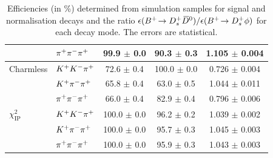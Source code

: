 \begin{table}[h]
\begin{tabular}{ l l c c c }
                              & ${{\pi}^+}{{\pi}^-}{{\pi}^+}$    & 99.9 $\pm$ 0.0         & 90.3 $\pm$ 0.3     & 1.105 $\pm$ 0.004  \\
      \hline
      Charmless               & ${{K}^+}{{K}^-}{{\pi}^+}$      & 72.6 $\pm$ 0.4         & 100.0 $\pm$ 0.0     & 0.726 $\pm$ 0.004  \\
                              & ${{K}^+}{{\pi}^-}{{\pi}^+}$     & 65.8 $\pm$ 0.4         & 63.0 $\pm$ 0.5     & 1.044 $\pm$ 0.011  \\
                              & ${{\pi}^+}{{\pi}^-}{{\pi}^+}$    & 66.0 $\pm$ 0.4         & 82.9 $\pm$ 0.4     & 0.796 $\pm$ 0.006  \\
      \hline
      $\chi^{2}_{\text{IP}}$  & ${{K}^+}{{K}^-}{{\pi}^+}$      & 100.0 $\pm$ 0.0         & 96.2 $\pm$ 0.2     & 1.039 $\pm$ 0.002  \\
                              & ${{K}^+}{{\pi}^-}{{\pi}^+}$     & 100.0 $\pm$ 0.0         & 95.7 $\pm$ 0.3     & 1.045 $\pm$ 0.003  \\
                              & ${{\pi}^+}{{\pi}^-}{{\pi}^+}$    & 100.0 $\pm$ 0.0         & 95.9 $\pm$ 0.3     & 1.043 $\pm$ 0.003  \\
      \hline
   \end{tabular}
   \caption{Efficiencies (in \%) determined from simulation samples for signal and normalisation decays and the ratio $\epsilon({{{B}^+}}\!\rightarrow {\ensuremath{{D}^+_{s}}}{\ensuremath{{\kern 0.2em\overline{\kern -0.2em D}{}}{}^0}})/\epsilon({{{B}^+}}\!\rightarrow {\ensuremath{{D}^+_{s}}}\phi)$ for each \Dsp decay mode. The errors are statistical.} 
   \label{tab:B2DsPhi_eff} 
\end{table}



